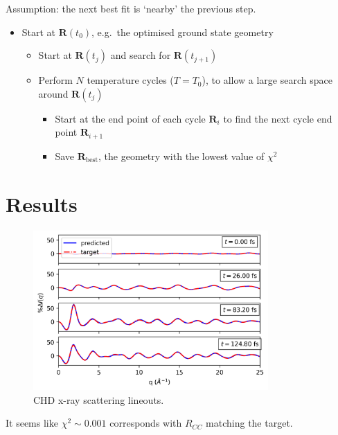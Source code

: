 \documentclass[]{article}
\newcommand{\bfR}{\textbf{R}}
\begin{document}
	Assumption: the next best fit is `nearby' the previous step.
	
	\begin{itemize}
		\item Start at $\bfR(t_0)$, e.g.\ the optimised ground state geometry
		\begin{itemize}
			\item Start at $\bfR(t_j)$ and search for $\bfR(t_{j+1})$
			\item Perform $N$ temperature cycles ($T = T_0$), to allow a large search space around $\bfR(t_j)$
			\begin{itemize}
				\item Start at the end point of each cycle $\bfR_i$ to find the next cycle end point $\bfR_{i+1}$
				\item Save $\bfR_\textrm{best}$, the geometry with the lowest value of $\chi^2$
				
			\end{itemize}
		\end{itemize}
		
	\end{itemize}
	
	
	\section{Results}

	\begin{figure}[H]
	\centering
	\includegraphics[width=0.8\textwidth]{lineouts.png}
	\caption{CHD x-ray scattering lineouts.}
	\end{figure}
	
	It seems like $\chi^2 \sim 0.001$ corresponds with $R_{CC}$ matching the target.
	
\end{document}
